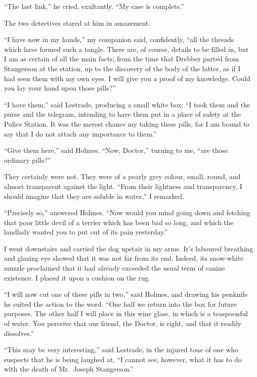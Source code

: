 \documentclass[12pt,english]{book}
\begin{document}
{}``The last link,'' he cried, exultantly. {}``My case is complete.''

The two detectives stared at him in amazement.

{}``I have now in my hands,'' my companion said, confidently, {}``all
the threads which have formed such a tangle. There are, of course,
details to be filled in, but I am as certain of all the main facts,
from the time that Drebber parted from Stangerson at the station,
up to the discovery of the body of the latter, as if I had seen them
with my own eyes. I will give you a proof of my knowledge. Could you
lay your hand upon those pills?''

{}``I have them,'' said Lestrade, producing a small white box; {}``I
took them and the purse and the telegram, intending to have them put
in a place of safety at the Police Station. It was the merest chance
my taking these pills, for I am bound to say that I do not attach
any importance to them.''

{}``Give them here,'' said Holmes. {}``Now, Doctor,'' turning
to me, {}``are those ordinary pills?''

They certainly were not. They were of a pearly grey colour, small,
round, and almost transparent against the light. {}``From their lightness
and transparency, I should imagine that they are soluble in water,''
I remarked.

{}``Precisely so,'' answered Holmes. {}``Now would you mind going
down and fetching that poor little devil of a terrier which has been
bad so long, and which the landlady wanted you to put out of its pain
yesterday.''

I went downstairs and carried the dog upstair in my arms. It's laboured
breathing and glazing eye showed that it was not far from its end.
Indeed, its snow-white muzzle proclaimed that it had already exceeded
the usual term of canine existence. I placed it upon a cushion on
the rug.

{}``I will now cut one of these pills in two,'' said Holmes, and
drawing his penknife he suited the action to the word. {}``One half
we return into the box for future purposes. The other half I will
place in this wine glass, in which is a teaspoonful of water. You
perceive that our friend, the Doctor, is right, and that it readily
dissolves.''

{}``This may be very interesting,'' said Lestrade, in the injured
tone of one who suspects that he is being laughed at, {}``I cannot
see, however, what it has to do with the death of Mr.\ Joseph Stangerson.''
\end{document}
